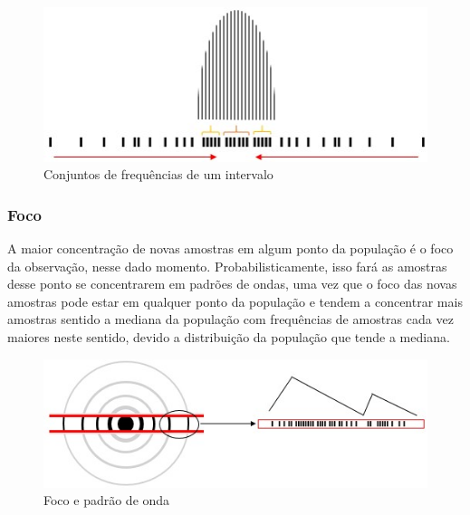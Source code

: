 \begin{figure}[H]
\caption{Conjuntos de frequências de um intervalo}
\label{fig:consciousness_inferred_coexistence}
\centering
\includegraphics[scale=1]{sections/images/consciousness_inferred_coexistence.jpg}
\end{figure}

\subsubsection{Foco}
A maior concentração de novas amostras em algum ponto da população é o foco da observação, nesse dado momento. Probabilisticamente, isso fará as amostras desse ponto se concentrarem em padrões de ondas, uma vez que o foco das novas amostras pode estar em qualquer ponto da população e tendem a concentrar mais amostras sentido a mediana da população com frequências de amostras cada vez maiores neste sentido, devido a distribuição da população que tende a mediana.

\begin{figure}[H]
\caption{Foco e padrão de onda}
\label{fig:consciousness_focus}
\centering
\includegraphics[scale=1]{sections/images/consciousness_focus.jpg}
\end{figure}
